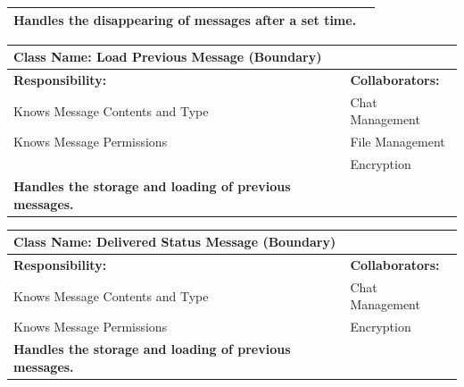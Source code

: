 \documentclass[]{article}
\begin{document}
\begin{itemize}
\begin{table}[ht]
\begin{tabular}{|p{7cm}|p{7cm}|}
            \vspace{0.1in}
            \textbf{Handles the disappearing of messages after a set time.}

		\vspace{1in} & \\
		\hline
  
		\end{tabular}
	\end{table}


	\begin{table}[ht]
		\centering
		\begin{tabular}{|p{7cm}|p{7cm}|}
		\hline 
		 \multicolumn{2}{|l|}{\textbf{Class Name:} Load Previous Message (Boundary)} \\
		\hline
		\textbf{Responsibility:} & \textbf{Collaborators:} \\
		\hline
            Knows Message Contents and Type & Chat Management\\
            Knows Message Permissions & File Management\\
            & Encryption\\
            
            \vspace{0.1in}
            \textbf{Handles the storage and loading of previous messages.}

		\vspace{1in} & \\
		\hline
  
		\end{tabular}
	\end{table}


	\begin{table}[ht]
		\centering
		\begin{tabular}{|p{7cm}|p{7cm}|}
		\hline 
		 \multicolumn{2}{|l|}{\textbf{Class Name:} Delivered Status Message (Boundary)} \\
		\hline
		\textbf{Responsibility:} & \textbf{Collaborators:} \\
		\hline
            Knows Message Contents and Type & Chat Management\\
            Knows Message Permissions & Encryption\\
            \vspace{0.1in}
            \textbf{Handles the storage and loading of previous messages.}

		\vspace{1in} & \\
		\hline
  
		\end{tabular}
	\end{table}
\end{itemize}
\end{document}
